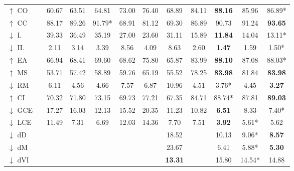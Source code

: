 \documentclass[journal]{IEEEtran}
\begin{document}
\begin{table*}[!htbp]
\begin{tabular}{@{} l *{11}{S[table-format=2.3,detect-inline-weight=math,table-align-text-post=false]} @{}}
$\uparrow$ CO    &       & 60.67         & 63.51 & 64.81  & 73.00         & 76.40 & 68.89          & 84.11 & \bfseries 88.16    & 85.96             & 86.89*            \\
$\uparrow$ CC    &       & 88.17         & 89.26 & 91.79* & 68.91         & 81.12 & 69.30          & 86.89 & 90.73              & 91.24             & \bfseries 93.65   \\
$\downarrow$ I.  &       & 39.33         & 36.49 & 35.19  & 27.00         & 23.60 & 31.11          & 15.89 & \bfseries 11.84    & 14.04             & 13.11*            \\
$\downarrow$ II. &       & 2.11          & 3.14  & 3.39   & 8.56          & 4.09  & 8.63           & 2.60  & \bfseries 1.47     & 1.59              & 1.50*             \\
$\uparrow$ EA    &       & 66.94         & 68.41 & 69.60  & 68.62         & 75.80 & 65.87          & 83.99 & \bfseries 88.10    & 87.08             & 88.03*            \\
$\uparrow$ MS    &       & 53.71         & 57.42 & 58.89  & 59.76         & 65.19 & 55.52          & 78.25 & \bfseries 83.98    & 81.84             & \bfseries 83.98   \\
$\downarrow$ RM  &       & 6.11          & 4.56  & 4.66   & 7.57          & 6.87  & 10.96          & 4.51  & 3.76*              & 4.45              & \bfseries 3.27    \\
$\uparrow$ CI    &       & 70.32         & 71.80 & 73.15  & 69.73         & 77.21 & 67.35          & 84.71 & 88.74*             & 87.81             & \bfseries 89.03   \\
$\downarrow$ GCE &       & 17.27         & 16.03 & 12.13  & 15.52         & 20.35 & 11.23          & 10.82 & \bfseries 6.51     & 8.33              & 7.40*             \\
$\downarrow$ LCE &       & 11.49         & 7.31  & 6.69   & 12.03         & 14.36 & 7.70           & 7.51  & \bfseries 3.92     & 5.61*             & 5.62              \\
$\downarrow$ dD  &       &               &       &        &               &       & 18.52          &       & 10.13              & 9.06*             & \bfseries 8.57    \\
$\downarrow$ dM  &       &               &       &        &               &       & 23.67          &       & 6.41               & 5.88*             & \bfseries 5.30    \\
$\downarrow$ dVI &       &               &       &        &               &       & \bfseries 13.31 &       & 15.80             & 14.54*            & 14.88             \\
\bottomrule
\end{tabular}
\end{table*}
\end{document}
